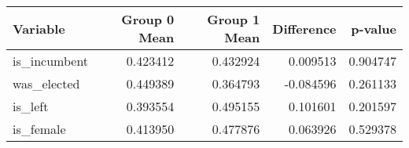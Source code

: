 \begin{tabular}{lrrrr}
\toprule
Variable & Group 0 Mean & Group 1 Mean & Difference & p-value \\
\midrule
is_incumbent & 0.423412 & 0.432924 & 0.009513 & 0.904747 \\
was_elected & 0.449389 & 0.364793 & -0.084596 & 0.261133 \\
is_left & 0.393554 & 0.495155 & 0.101601 & 0.201597 \\
is_female & 0.413950 & 0.477876 & 0.063926 & 0.529378 \\
\bottomrule
\end{tabular}
